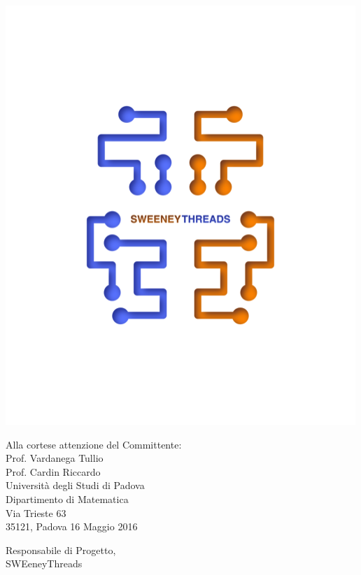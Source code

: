 \documentclass[a4paper]{article}
\begin{document}
	\noindent\begin{minipage}{0.3\textwidth}
		\includegraphics[scale=0.6]{sweeney.png}
	\end{minipage}
	\begin{minipage}{0.7\textwidth}
		\begin{flushright}
			Alla cortese attenzione del Committente: \\
			Prof. Vardanega Tullio \\
			Prof. Cardin Riccardo \\
			Università degli Studi di Padova \\
			Dipartimento di Matematica \\
			Via Trieste 63\\
			35121, Padova
			\vspace{5mm} 16 Maggio 2016
		\end{flushright}
	\end{minipage}
	
	\begin{minipage}{\textwidth}
		\begin{flushleft}
			Responsabile di Progetto,\\
			SWEeneyThreads\\
		\end{flushleft}
	\end{minipage}	
\end{document}
